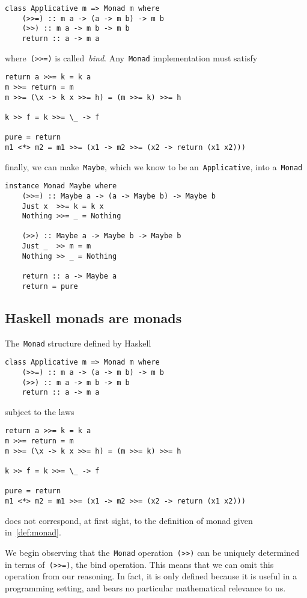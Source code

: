 \documentclass[a4paper]{article}
\theoremstyle{plain}
\theoremstyle{definition}
\begin{document}
\begin{verbatim}
class Applicative m => Monad m where
    (>>=) :: m a -> (a -> m b) -> m b
    (>>) :: m a -> m b -> m b
    return :: a -> m a
\end{verbatim}
where~\texttt{(>>=)} is called~\emph{bind}.
Any~\texttt{Monad} implementation must satisfy
\begin{verbatim}
return a >>= k = k a
m >>= return = m
m >>= (\x -> k x >>= h) = (m >>= k) >>= h

k >> f = k >>= \_ -> f

pure = return
m1 <*> m2 = m1 >>= (x1 -> m2 >>= (x2 -> return (x1 x2)))
\end{verbatim}
finally, we can make~\texttt{Maybe}, which we know to be
an~\texttt{Applicative}, into a~\texttt{Monad}
\begin{verbatim}
instance Monad Maybe where
    (>>=) :: Maybe a -> (a -> Maybe b) -> Maybe b
    Just x  >>= k = k x
    Nothing >>= _ = Nothing

    (>>) :: Maybe a -> Maybe b -> Maybe b
    Just _  >> m = m
    Nothing >> _ = Nothing

    return :: a -> Maybe a
    return = pure
\end{verbatim}

\subsection{Haskell monads are monads}
The~\texttt{Monad} structure defined by Haskell
\begin{verbatim}
class Applicative m => Monad m where
    (>>=) :: m a -> (a -> m b) -> m b
    (>>) :: m a -> m b -> m b
    return :: a -> m a
\end{verbatim}
subject to the laws
\begin{verbatim}
return a >>= k = k a
m >>= return = m
m >>= (\x -> k x >>= h) = (m >>= k) >>= h

k >> f = k >>= \_ -> f

pure = return
m1 <*> m2 = m1 >>= (x1 -> m2 >>= (x2 -> return (x1 x2)))
\end{verbatim}
does not correspond, at first sight, to the definition of monad given
in~\ref{def:monad}.

We begin observing that the~\texttt{Monad}
operation~\texttt{(>>)} can be uniquely determined in terms
of~\texttt{(>>=)}, the bind operation.
This means that we can omit this operation from our reasoning. In fact, it is
only defined because it is useful in a programming setting, and bears no
particular mathematical relevance to us.
\end{document}
